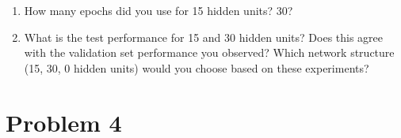 \documentclass{article}
\begin{document}
\begin{enumerate}
\begin{enumerate}
    \item How many epochs did you use for 15 hidden units? 30?

    \item What is the test performance for 15 and 30 hidden units? Does this agree
      with the validation set performance you observed? Which network structure
      (15, 30, 0 hidden units) would you choose based on these experiments?


    \end{enumerate}


  \end{enumerate}

  \section*{Problem 4}
\end{document}
